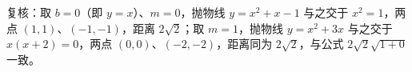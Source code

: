 \begin{answer}
复核：取 $b=0$（即 $y=x$）、$m=0$，抛物线 $y=x^2+x-1$ 与之交于 $x^2=1$，两点 $(1,1)$、$(-1,-1)$，距离 $2\sqrt2$；取 $m=1$，抛物线 $y=x^2+3x$ 与之交于 $x(x+2)=0$，两点 $(0,0)$、$(-2,-2)$，距离同为 $2\sqrt2$，与公式 $2\sqrt2\sqrt{1+0}$ 一致。




\end{answer}